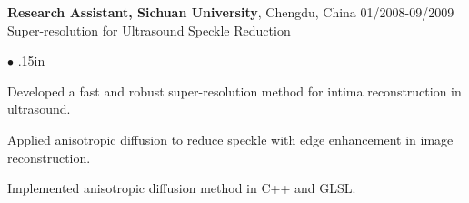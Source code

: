 \documentclass[line,margin]{res}
\newenvironment{bullets}{\begin{list}{\tiny$\bullet$}{\topsep 0pt \itemsep -2pt \leftmargin .15in}}{\vspace*{4pt}\end{list}}
\begin{document}
\begin{resume}
\textbf{Research Assistant, Sichuan University}, Chengdu, China \hfill      01/2008-09/2009 \\%
Super-resolution for Ultrasound Speckle Reduction
\begin{bullets}
\item Developed a fast and robust super-resolution method for intima reconstruction in
ultrasound. 
\item Applied anisotropic diffusion to reduce speckle with edge enhancement in image reconstruction.
\item Implemented anisotropic diffusion method in C++ and GLSL.
\end{bullets} %

\vspace{-.1in}



\end{resume}
\end{document}
